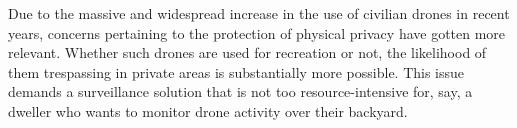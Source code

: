 Due to the massive and widespread increase in the use of civilian drones in recent years, concerns pertaining to the protection of physical privacy have gotten more relevant. Whether such drones are used for recreation or not, the likelihood of them trespassing in private areas is substantially more possible. This issue demands a surveillance solution that is not too resource-intensive for, say, a dweller who wants to monitor drone activity over their backyard.
